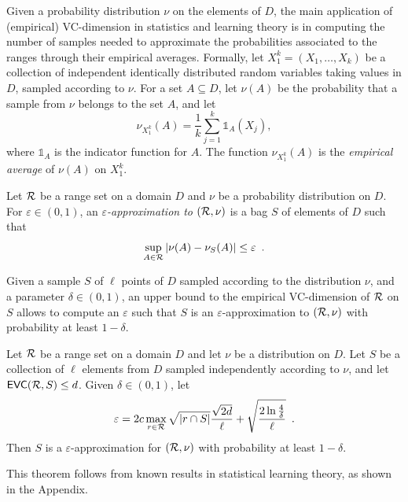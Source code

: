 Given a probability distribution $\nu$ on the elements of $D$, the main
application of (empirical) VC-dimension in statistics and learning theory is in
computing the number of samples needed to approximate the probabilities
associated to the ranges through their empirical averages.  Formally, let
$X_1^k=(X_1,\dotsc,X_k)$ be a collection of independent identically distributed
random variables taking values in $D$, sampled according to $\nu$.
For a set $A\subseteq D$, let $\nu(A)$ be the probability that a sample from
$\nu$ belongs to the set $A$, and let
\[
\nu_{X_1^k}(A)=\frac{1}{k}\sum_{j=1}^k\mathds{1}_A(X_j),\]
where $\mathds{1}_A$ is the indicator function for $A$. The function
$\nu_{X_1^k}(A)$ is the \emph{empirical average} of $\nu(A)$ on $X_1^k$.

\begin{definition}\label{def:eapprox}
  Let $\mathcal{R}$ be a range set on a domain
  $D$ and $\nu$ be a probability distribution on $D$. For $\varepsilon\in(0,1)$,
  an \emph{$\varepsilon$-approximation to $(\mathcal{R},\nu)$} is a bag $S$ of
  elements of $D$ such that
  \[
  \sup_{A\in\mathcal{R}}|\nu(A)-\nu_S(A)|\le\varepsilon\enspace.\]
\end{definition}

Given a sample $S$ of $\ell$ points of $D$ sampled according to the distribution
$\nu$, and a parameter $\delta\in(0,1)$, an upper bound to the empirical
VC-dimension of $\mathcal{R}$ on $S$ allows to compute an $\varepsilon$ such that $S$
is an $\varepsilon$-approximation to $(\mathcal{R},\nu)$ with probability at least
$1-\delta$.

\begin{theorem}\label{thm:eapproxempir}
	Let $\mathcal{R}$ be a range set on a domain $D$ and let $\nu$ be a distribution
	on $D$. Let $S$ be a collection of $\ell$ elements from $D$ sampled
	independently according to $\nu$, and let $\mathsf{EVC}(\mathcal{R},S)\le d$. Given
	$\delta\in(0,1)$, let
	\begin{equation}\label{eq:evceapprox}
		\varepsilon = 2c\max_{r\in\mathcal{R}}\sqrt{|r\cap S|}\frac{\sqrt{2d}}{\ell} +
		\sqrt{\frac{2\ln\frac{4}{\delta}}{\ell}}\enspace.
	\end{equation}
	Then $S$ is a $\varepsilon$-approximation for $(\mathcal{R},\nu)$ with
	probability at least $1-\delta$.
\end{theorem}
This theorem follows from known results in statistical learning theory, as shown
in the Appendix.

